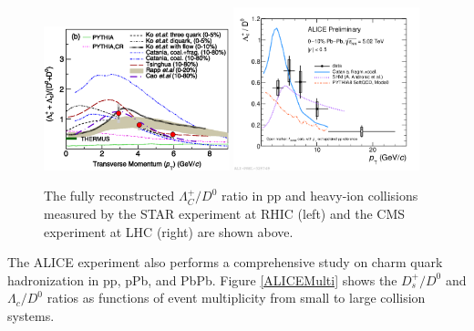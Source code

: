 \begin{figure}[hbtp]
\begin{center}
\includegraphics[width=0.48\textwidth]{Figures/Chapter2/STARLambdaCD0.png}
\includegraphics[width=0.48\textwidth]{Figures/Chapter2/ALICELambdaCD0}
\caption{The fully reconstructed $\Lambda_C^+/D^0$ ratio in pp and heavy-ion collisions measured by the STAR experiment at RHIC (left) and the CMS experiment at LHC (right) are shown above.}
\label{HadroPlotCharm}
\end{center}
\end{figure}   

\clearpage


The ALICE experiment also performs a comprehensive study on charm quark hadronization in pp, pPb, and PbPb. Figure \ref{ALICEMulti} shows the $D^+_s/D^0$ and $\Lambda_c/D^0$  ratios as functions of event multiplicity from small to large collision systems. 

